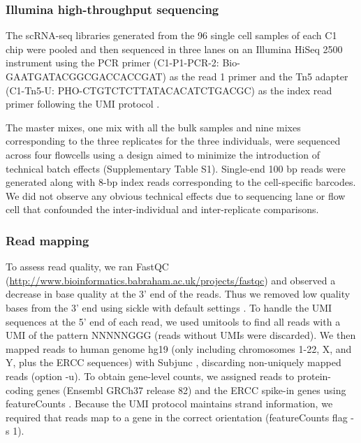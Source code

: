 \subsubsection{Illumina high-throughput
sequencing}\label{illumina-high-throughput-sequencing}

The scRNA-seq libraries generated from the 96 single cell samples of
each C1 chip were pooled and then sequenced in three lanes on an
Illumina HiSeq 2500 instrument using the PCR primer (C1-P1-PCR-2:
Bio-GAATGATACGGCGACCACCGAT) as the read 1 primer and the Tn5 adapter
(C1-Tn5-U: PHO-CTGTCTCTTATACACATCTGACGC) as the index read primer
following the UMI protocol \citep{Islam2014}.

The master mixes, one mix with all the bulk samples and nine mixes
corresponding to the three replicates for the three individuals, were
sequenced across four flowcells using a design aimed to minimize the
introduction of technical batch effects (Supplementary Table S1).
Single-end 100 bp reads were generated along with 8-bp index reads
corresponding to the cell-specific barcodes. We did not observe any
obvious technical effects due to sequencing lane or flow cell that
confounded the inter-individual and inter-replicate comparisons.

\subsubsection{Read mapping}\label{read-mapping}

To assess read quality, we ran FastQC
(\url{http://www.bioinformatics.babraham.ac.uk/projects/fastqc}) and
observed a decrease in base quality at the 3' end of the reads. Thus we
removed low quality bases from the 3' end using sickle with default
settings \citep{Joshi2011}. To handle the UMI sequences at the 5' end of
each read, we used umitools \citep{umitools} to find all reads with a UMI
of the pattern NNNNNGGG (reads without UMIs were discarded). We then
mapped reads to human genome hg19 (only including chromosomes 1-22, X,
and Y, plus the ERCC sequences) with Subjunc \citep{Liao2013}, discarding
non-uniquely mapped reads (option -u). To obtain gene-level counts, we
assigned reads to protein-coding genes (Ensembl GRCh37 release 82) and
the ERCC spike-in genes using featureCounts \citep{Liao2014}. Because the
UMI protocol maintains strand information, we required that reads map to
a gene in the correct orientation (featureCounts flag -s 1).

